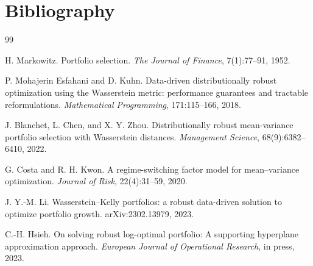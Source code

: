 \documentclass[11pt]{article}
\begin{document}
\section{Bibliography}
\begin{thebibliography}{99}

H. Markowitz.
\newblock Portfolio selection.
\newblock \emph{The Journal of Finance}, 7(1):77--91, 1952.

P. Mohajerin Esfahani and D. Kuhn.
\newblock Data-driven distributionally robust optimization using the Wasserstein metric: performance guarantees and tractable reformulations.
\newblock \emph{Mathematical Programming}, 171:115--166, 2018.

J. Blanchet, L. Chen, and X. Y. Zhou.
\newblock Distributionally robust mean-variance portfolio selection with Wasserstein distances.
\newblock \emph{Management Science}, 68(9):6382--6410, 2022.

G. Costa and R. H. Kwon.
\newblock A regime-switching factor model for mean--variance optimization.
\newblock \emph{Journal of Risk}, 22(4):31--59, 2020.

J. Y.-M. Li.
\newblock Wasserstein--Kelly portfolios: a robust data-driven solution to optimize portfolio growth.
\newblock arXiv:2302.13979, 2023.

C.-H. Hsieh.
\newblock On solving robust log-optimal portfolio: A supporting hyperplane approximation approach.
\newblock \emph{European Journal of Operational Research}, in press, 2023.

\end{thebibliography}
\end{document}

